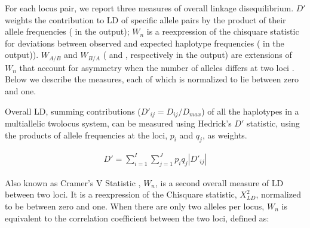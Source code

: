 \documentclass[letterpaper,10pt,english,openany,oneside]{sphinxmanual}
\begin{document}
\sphinxAtStartPar
For each locus pair, we report three measures of overall linkage
disequilibrium. \(D'\)  weights the contribution to
LD of specific allele pairs by the product of their allele frequencies
( in the output); \(W_n\)  is a re\sphinxhyphen{}expression
of the chi\sphinxhyphen{}square statistic for deviations between observed and
expected haplotype frequencies ( in the
output)). \(W_{A/B}\) and \(W_{B/A}\) ( and
, respectively in the output) are extensions of \(W_n\)
that account for asymmetry when the number of alleles differs at two
loci . Below we describe the measures, each of
which is normalized to lie between zero and one.
\begin{description}
\sphinxAtStartPar
Overall LD, summing contributions (\(D'_{ij}=D_{ij} /D_{max}\)) of all the haplotypes in a
multi\sphinxhyphen{}allelic two\sphinxhyphen{}locus system, can be measured using Hedrick’s
\(D'\) statistic, using the products of allele frequencies at the
loci, \(p_i\) and \(q_j\), as weights.

\end{description}
\begin{equation*}
\begin{split}{D}' = \sum_{i=1}^{I} {\sum_{j=1}^{J} {p_i } } q_j \left|{{D}'_{ij} } \right|\end{split}
\end{equation*}\begin{description}
\sphinxAtStartPar
Also known as Cramer’s V Statistic , \(W_n\), is a
second overall measure of LD between two loci. It is a re\sphinxhyphen{}expression
of the Chi\sphinxhyphen{}square statistic, \(X^2_{LD}\), normalized
to be between zero and one. When there are only two alleles per
locus, \(W_n\) is equivalent to the correlation coefficient
between the two loci, defined as:

\end{description}
\end{document}
